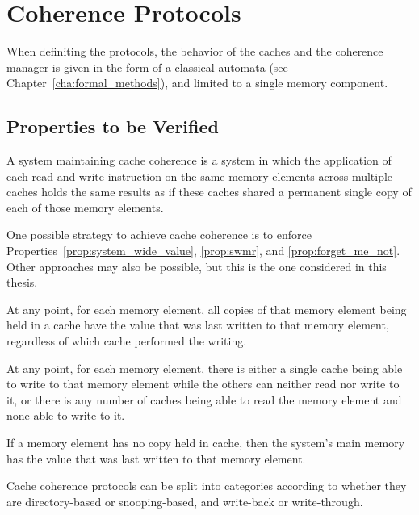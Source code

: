 \section{Coherence Protocols}
When definiting the protocols, the behavior of the caches and the coherence
manager is given in the form of a classical automata (see
Chapter~\ref{cha:formal_methods}), and limited to a single memory component.


\subsection{Properties to be Verified}
\label{sec:proper_cache_coherence_protocol}
A system maintaining cache coherence is a system in which the application of
each read and write instruction on the same memory elements across multiple
caches holds the same results as if these caches shared a permanent single copy
of each of those memory elements.

One possible strategy to achieve cache coherence is to enforce
Properties~\ref{prop:system_wide_value}, \ref{prop:swmr}, and
\ref{prop:forget_me_not}. Other approaches may also be possible, but this is
the one considered in this thesis.

\begin{property}%
\label{prop:system_wide_value}
At any point, for each memory element, all copies of that memory element being
held in a cache have the value that was last written to that memory element,
regardless of which cache performed the writing.
\end{property}

\begin{property}%
\label{prop:swmr}
At any point, for each memory element, there is either a single cache being
able to write to that memory element while the others can neither read nor
write to it, or there is any number of caches being able to read the memory
element and none able to write to it.
\end{property}

\begin{property}%
\label{prop:forget_me_not}
If a memory element has no copy held in cache, then the system's main memory
has the value that was last written to that memory element.
\end{property}

Cache coherence protocols can be split into categories according to whether
they are directory-based or snooping-based, and write-back or write-through.

